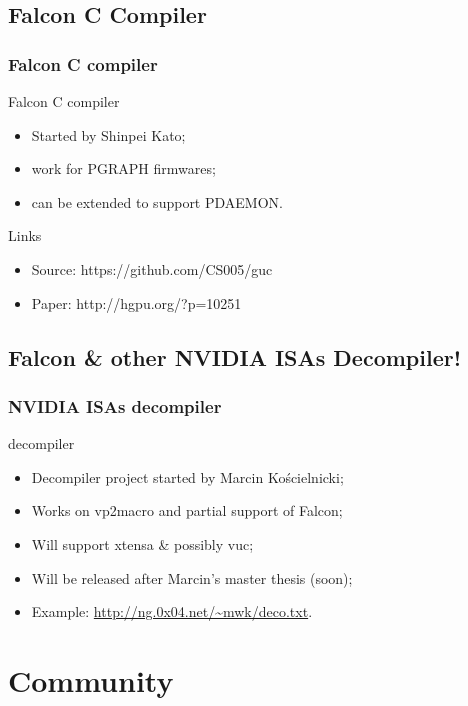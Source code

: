 \documentclass[11pt,english,compress]{beamer}
\begin{document}
\subsection{Falcon C Compiler}
\begin{frame}
	\frametitle{Falcon C compiler}

	\begin{block}{Falcon C compiler}
		\begin{itemize}
			\item Started by Shinpei Kato;
			\item work for PGRAPH firmwares;
			\item can be extended to support PDAEMON.
		\end{itemize}
	\end{block}

	\begin{block}{Links}
		\begin{itemize}
			\item Source: https://github.com/CS005/guc
			\item Paper: http://hgpu.org/?p=10251
		\end{itemize}
	\end{block}
\end{frame}

\subsection{Falcon \& other NVIDIA ISAs Decompiler!}
\begin{frame}
	\frametitle{NVIDIA ISAs decompiler}

	\begin{block}{decompiler}
		\begin{itemize}
			\item Decompiler project started by Marcin Kościelnicki;
			\item Works on vp2macro and partial support of Falcon;
			\item Will support xtensa \& possibly vuc;
			\item Will be released after Marcin's master thesis
(soon);
			\item Example: \url{http://ng.0x04.net/~mwk/deco.txt}.
		\end{itemize}
	\end{block}
\end{frame}

\section{Community}
\end{document}
